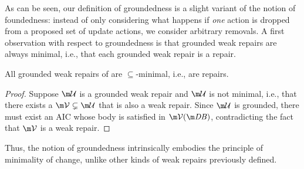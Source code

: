 As can be seen, our definition of groundedness is a slight variant of the notion of foundedness: instead of only considering what happens if \emph{one} action is dropped from a proposed set of update actions, we consider arbitrary removals. 
A first observation with respect to groundedness is that grounded weak repairs are always minimal, i.e., that each grounded weak repair is a repair. 
\begin{proposition}
 All grounded weak repairs of \fulldb are $\subseteq$-minimal, i.e., are repairs. 
\end{proposition}
\begin{proof}
 Suppose $\UU$ is a grounded weak repair and $\UU$ is not minimal, i.e., that there exists a $\VV\subsetneq \UU$ that is also a weak repair. 
 Since $\UU$ is grounded, there must exist an AIC whose body is satisfied in $\VV(\db)$, contradicting the fact  that $\VV$ is a weak repair. 
\end{proof}
Thus, the notion of groundedness intrinsically embodies the principle of minimality of change, unlike other kinds of weak repairs previously defined.


